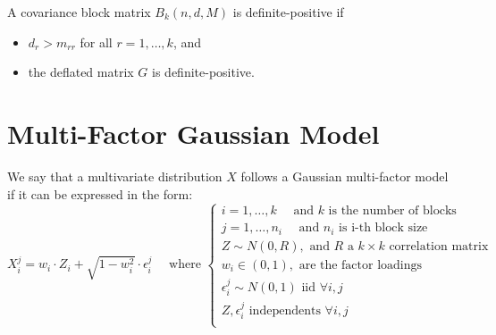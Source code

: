 \documentclass[11pt,fleqn]{book} %
\begin{document}
\begin{corollary}
	A covariance block matrix $B_k(n,d,M)$ is definite-positive if
	\begin{itemize}
		\item $d_r > m_{rr}$ for all $r=1,\dots,k$, and
		\item the deflated matrix $G$ is definite-positive.
	\end{itemize}
\end{corollary}

\section{Multi-Factor Gaussian Model}

\begin{definition}
\label{def:gmfm}
	We say that a multivariate distribution $X$ follows a Gaussian multi-factor
	model if it can be expressed in the form:
	\begin{displaymath}
		X_i^j = w_i \cdot Z_i + \sqrt{1-w_i^2} \cdot \epsilon_i^j
		\quad \text{ where } \left\{
		\begin{array}{l}
			i = 1, \dots, k \quad \text{ and $k$ is the number of blocks}    \\
			j = 1, \dots, n_i \quad \text{ and $n_i$ is i-th block size}     \\
			Z \sim N(0,R), \text{ and $R$ a $k {\times} k$ correlation matrix} \\
			w_i \in (0,1), \text{ are the factor loadings }                  \\
			\epsilon_i^j \sim N(0,1) \text { iid } \forall i,j               \\
			Z, \epsilon_i^j \text{ independents } \forall i,j                \\
		\end{array}
		\right.
	\end{displaymath}
\end{definition}
\end{document}
